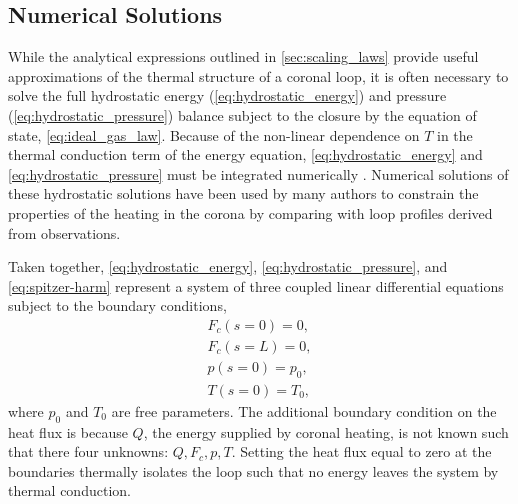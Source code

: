 \subsection{Numerical Solutions}\label{sec:hydrostatic_numerical}


While the analytical expressions outlined in \autoref{sec:scaling_laws} provide useful approximations of the thermal structure of a coronal loop, it is often necessary to solve the full hydrostatic energy (\autoref{eq:hydrostatic_energy}) and pressure (\autoref{eq:hydrostatic_pressure}) balance subject to the closure by the equation of state, \autoref{eq:ideal_gas_law}. Because of the non-linear dependence on $T$ in the thermal conduction term of the energy equation, \autoref{eq:hydrostatic_energy} and \autoref{eq:hydrostatic_pressure} must be integrated numerically \citep[e.g. with an Euler or Runge-Kutta scheme, see][Chapter 16]{press_numerical_1992}. Numerical solutions of these hydrostatic solutions have been used by many authors \citep[e.g.][]{aschwanden_modeling_2001} to constrain the properties of the heating in the corona by comparing with loop profiles derived from observations.

Taken together, \autoref{eq:hydrostatic_energy}, \autoref{eq:hydrostatic_pressure}, and \autoref{eq:spitzer-harm} represent a system of three coupled linear differential equations subject to the boundary conditions,
\begin{align}
    F_c(s=0) = 0, \label{eq:hydrostatic:bc1}\\
    F_c(s=L) = 0, \label{eq:hydrostatic:bc2}\\
    p(s=0) = p_0, \\
    T(s=0) = T_0,
\end{align}
where $p_0$ and $T_0$ are free parameters. The additional boundary condition on the heat flux is because $Q$, the energy supplied by coronal heating, is not known such that there four unknowns: $Q,F_c,p,T$. Setting the heat flux equal to zero at the boundaries thermally isolates the loop such that no energy leaves the system by thermal conduction.

